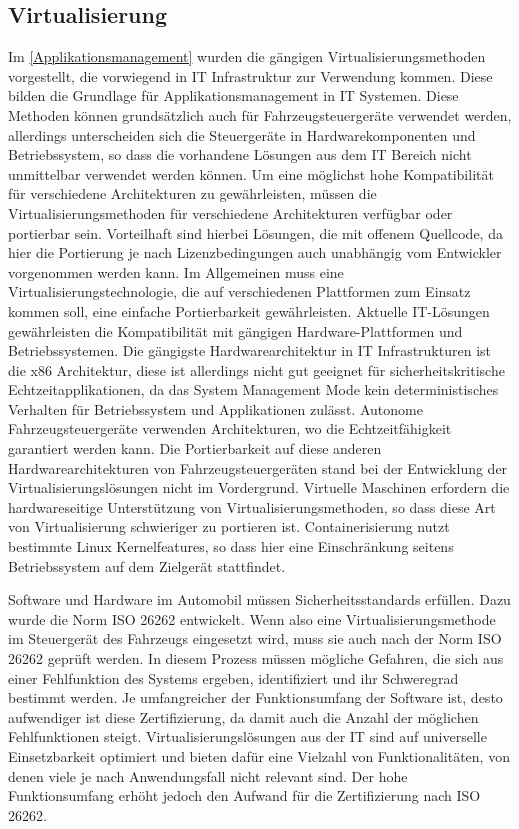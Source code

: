 \subsection{Virtualisierung}
Im \autoref{Applikationsmanagement} wurden die gängigen Virtualisierungsmethoden vorgestellt, die vorwiegend in IT Infrastruktur zur Verwendung kommen. Diese bilden die Grundlage für Applikationsmanagement in IT Systemen. Diese Methoden können grundsätzlich auch für Fahrzeugsteuergeräte verwendet werden, allerdings unterscheiden sich die Steuergeräte in Hardwarekomponenten und Betriebssystem, so dass die vorhandene Lösungen aus dem IT Bereich nicht unmittelbar verwendet werden können. Um eine möglichst hohe Kompatibilität für verschiedene Architekturen zu gewährleisten, müssen die Virtualisierungsmethoden für verschiedene Architekturen verfügbar oder portierbar sein. Vorteilhaft sind hierbei Lösungen, die mit offenem Quellcode, da hier die Portierung je nach Lizenzbedingungen auch unabhängig vom Entwickler vorgenommen werden kann. Im Allgemeinen muss eine Virtualisierungstechnologie, die auf verschiedenen Plattformen zum Einsatz kommen soll, eine einfache Portierbarkeit gewährleisten. Aktuelle IT-Lösungen gewährleisten die Kompatibilität mit gängigen Hardware-Plattformen und Betriebssystemen. Die gängigste Hardwarearchitektur in IT Infrastrukturen ist die x86 Architektur, diese ist allerdings nicht gut geeignet für sicherheitskritische Echtzeitapplikationen, da das System Management Mode kein deterministisches Verhalten für Betriebssystem und Applikationen zulässt. Autonome Fahrzeugsteuergeräte verwenden Architekturen, wo die Echtzeitfähigkeit garantiert werden kann. Die Portierbarkeit auf diese anderen Hardwarearchitekturen von Fahrzeugsteuergeräten stand bei der Entwicklung der Virtualisierungslösungen nicht im Vordergrund. Virtuelle Maschinen erfordern die hardwareseitige Unterstützung von Virtualisierungsmethoden, so dass diese Art von Virtualisierung schwieriger zu portieren ist. Containerisierung nutzt bestimmte Linux Kernelfeatures, so dass hier eine Einschränkung seitens Betriebssystem auf dem Zielgerät stattfindet. 

Software und Hardware im Automobil müssen Sicherheitsstandards erfüllen. Dazu wurde die Norm ISO 26262 entwickelt. \cite{Birch2013} Wenn also eine Virtualisierungsmethode im Steuergerät des Fahrzeugs eingesetzt wird, muss sie auch nach der Norm ISO 26262 geprüft werden. In diesem Prozess müssen mögliche Gefahren, die sich aus einer Fehlfunktion des Systems ergeben, identifiziert und ihr Schweregrad bestimmt werden. Je umfangreicher der Funktionsumfang der Software ist, desto aufwendiger ist diese Zertifizierung, da damit auch die Anzahl der möglichen Fehlfunktionen steigt. Virtualisierungslösungen aus der IT sind auf universelle Einsetzbarkeit optimiert und bieten dafür eine Vielzahl von Funktionalitäten, von denen viele je nach Anwendungsfall nicht relevant sind. Der hohe Funktionsumfang erhöht jedoch den Aufwand für die Zertifizierung nach ISO 26262.

